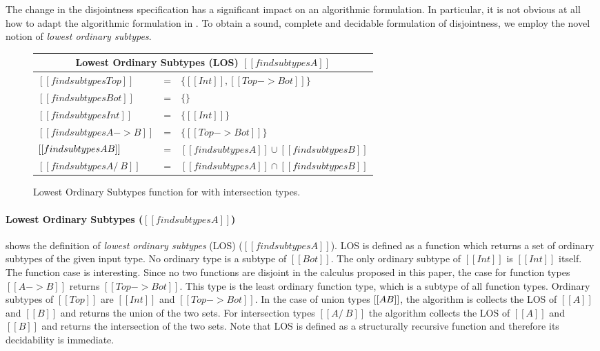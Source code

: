 The change in the disjointness specification has a significant impact on an
algorithmic formulation. In particular, it is not obvious at all how to adapt
the algorithmic formulation in . To obtain a
sound, complete and decidable formulation of disjointness, we employ the novel
notion of \emph{lowest ordinary subtypes}.

\begin{figure}[t]
    \centering
    {\renewcommand{\arraystretch}{1.2}
    \begin{tabular}{|lcl|}
      \multicolumn{3}{c}{Lowest Ordinary Subtypes (LOS) $[[findsubtypes A]]$} \\
      \hline
     $[[findsubtypes Top]]$ & = & $\{ [[Int]], [[Top -> Bot]]\}$  \\
     $[[findsubtypes Bot]]$ & = & $\{\}$  \\
     $[[findsubtypes Int]]$ & = & $\{ [[Int]] \}$  \\
     $[[findsubtypes A -> B]]$ & = & $\{ [[Top -> Bot]] \}$  \\
     $[[findsubtypes A \/ B]]$ & = & $ [[findsubtypes A]] \cup [[findsubtypes B]] $\\
     $[[findsubtypes A /\ B]]$ & = & $ [[findsubtypes A]] \cap [[findsubtypes B]] $\\
      \hline
    \end{tabular} }
  \caption{Lowest Ordinary Subtypes function for \cal with intersection types.}
  \label{fig:inter:los}
\end{figure}


\paragraph{Lowest Ordinary Subtypes ($[[findsubtypes A]]$)}
 shows the definition of
\emph{lowest ordinary subtypes} (LOS) ($[[findsubtypes A]]$).
LOS is defined as a function which
returns a set of ordinary subtypes of the given input type. 
No ordinary type is a subtype of $[[Bot]]$. The only ordinary
subtype of $[[Int]]$ is $[[Int]]$ itself. The function case is
interesting. Since no two functions are disjoint in the calculus
proposed in this paper, the case for function types $[[A -> B]]$ returns $[[Top
    -> Bot]]$. This type is the least ordinary function type, which is a subtype
of all function types.
Ordinary
subtypes of $[[Top]]$ are $[[Int]]$ and $[[Top -> Bot]]$.
In the case of union types $[[A \/ B]]$, the
algorithm is collects the LOS of $[[A]]$ and $[[B]]$ and returns the union of the
two sets. For intersection types $[[A
    /\ B]]$ the algorithm collects the LOS of $[[A]]$ and $[[B]]$
and returns the intersection of the two sets.
Note that LOS is defined as a structurally recursive function and therefore
its decidability is immediate.

